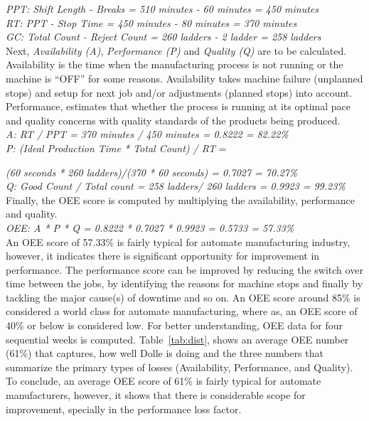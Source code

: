 \documentclass[runningheads]{llncs}
\begin{document}
\emph{PPT: Shift Length - Breaks = 510 minutes - 60 minutes = 450 minutes}\\

\emph{RT: PPT - Stop Time = 450 minutes - 80 minutes = 370 minutes}\\

\emph{GC: Total Count - Reject Count = 260 ladders - 2 ladder = 258 ladders} \\


Next, \emph{Availability (A)}, \emph{Performance (P)} and \emph{Quality (Q)} are to be calculated. Availability is the time when the manufacturing process is not running or the machine is ``OFF'' for some reasons. Availability takes machine failure (unplanned stops) and setup for next job and/or adjustments (planned stops) into account. Performance, estimates that whether the process is running at its optimal pace and quality concerns with quality standards of the products being produced.\\


\emph{A: RT / PPT = 370 minutes / 450 minutes = 0.8222 = 82.22\%}\\

\emph{P: (Ideal Production Time * Total Count) / RT} = 

\hspace{12mm} \emph{(60 seconds * 260 ladders)/(370 * 60 seconds) = 0.7027 = 70.27\%}\\

\emph{Q: Good Count / Total count = 258 ladders/ 260 ladders = 0.9923 = 99.23\%}\\

Finally, the OEE score is computed by multiplying the availability, performance and quality.\\ 

\emph{OEE: A * P * Q = 0.8222 * 0.7027 * 0.9923 = 0.5733 = 57.33\%}\\

An OEE score of 57.33\% is fairly typical for automate manufacturing industry, however, it indicates there is significant opportunity for improvement in performance. The performance score can be improved by reducing the switch over time between the jobs, by identifying the reasons for machine stops and finally by tackling the major cause(s) of downtime and so on. An OEE score around 85\% is considered a world class for automate manufacturing, where as, an OEE score of 40\% or below is considered low. For better understanding, OEE data for four sequential weeks is computed. Table~\ref{tab:dist}, shows an average OEE number (61\%) that captures, how well Dolle is doing and the three numbers that summarize the primary types of losses (Availability, Performance, and Quality). To conclude, an average OEE score of 61\% is fairly typical for automate manufacturers, however, it shows that there is considerable scope for improvement, specially in the performance loss factor.
\end{document}
